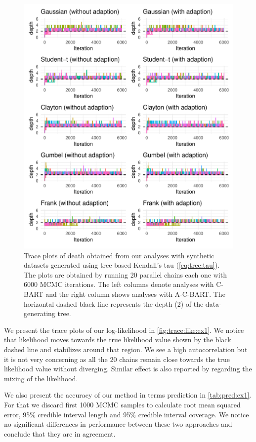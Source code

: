 \documentclass{amsart}
\begin{document}
\begin{figure}
	\centering
	\includegraphics[width = 0.95\linewidth]{"case_1_depth.pdf"}
	\caption{Trace plots of death obtained from our analyses with synthetic datasets generated using tree based Kendall's tau (\cref{eq:tree:tau}). The plots are obtained by running 20 parallel chains each one with 6000 MCMC iterations. The left columns denote analyses with C-BART and the right column shows analyses with A-C-BART. The horizontal dashed black line represents the depth (2) of the data-generating tree.}
	\label{fig:trace:depth:ex1}
\end{figure}

We present the trace plots of our log-likelihood in \cref{fig:trace:like:ex1}. We notice that likelihood moves towards the true likelihood value shown by the black dashed line and stabilizes around that region. We see a high autocorrelation but it is not very concerning as all the 20 chains remain close towards the true likelihood value without diverging. Similar effect is also reported by \citet{Linero02012025} regarding the mixing of the likelihood. 

We also present the accuracy of our method in terms prediction in \cref{tab:pred:ex1}. For that we discard first 1000 MCMC samples to calculate root mean squared error, 95\% credible interval length and 95\% credible interval coverage. We notice no significant differences in performance between these two approaches and conclude that they are in agreement.
\end{document}
